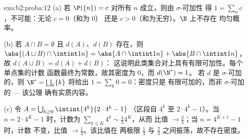 \begin{solution}{exo:b2:proba:12}
(a) 若 $\P(\{n\}) = c$ 对所有 $n$ 成立，则由 $\sigma$-可加性
得 $1 = \sum_nc$，不可能：无论 $c = 0$（和为 $0$）
还是 $c > 0$（和为无穷）。$\N$ 上不存在
均匀概率。

(b) 若 $A \cap B = \emptyset$ 且 $d(A)$、$d(B)$ 存在，则
$\abs{(A \sqcup B)\cap\intint1n} = \abs{A\cap\intint1n} +
\abs{B\cap\intint1n}$，故 $d(A \sqcup B) = d(A) + d(B)$：
这说明此类集合对上具有有限可加性。每个单点集的计数
函数最终为常数，故其密度为 $0$，而 $d(\N^*) = 1$。
若 $d$ 是 $\sigma$-可加的，则 $\N^* =
\bigsqcup_k\{k\}$ 将给出 $1 = \sum_k 0 = 0$：密度只是
有限可加的，而非 $\sigma$-可加的 --- 该公理
确有实质内容。

(c) 令 $A = \bigcup_{k\geq0}\intint{4^k}{2\cdot4^k - 1}$
（区段自 $4^k$ 至 $2\cdot4^k - 1$）。当 $n = 2\cdot4^K -
1$ 时，计数为 $\sum_{k\leq K}4^k \sim \frac43 4^K$，从而
比值 $\to \frac23$；当 $n = 4^{K+1} - 1$ 时，计数
不变，比值 $\to \frac13$。该比值在
两极限 $\frac13$ 与 $\frac23$ 之间振荡，故不存在密度。
\end{solution}

